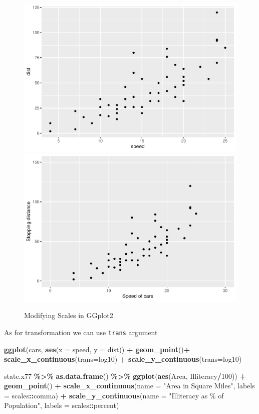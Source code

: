 \documentclass[
]{book}
\newenvironment{Shaded}{\begin{snugshade}}{\end{snugshade}}
\newcommand{\AttributeTok}[1]{\textcolor[rgb]{0.13,0.29,0.53}{#1}}
\newcommand{\DecValTok}[1]{\textcolor[rgb]{0.00,0.00,0.81}{#1}}
\newcommand{\FunctionTok}[1]{\textcolor[rgb]{0.13,0.29,0.53}{\textbf{#1}}}
\newcommand{\NormalTok}[1]{#1}
\newcommand{\SpecialCharTok}[1]{\textcolor[rgb]{0.81,0.36,0.00}{\textbf{#1}}}
\newcommand{\StringTok}[1]{\textcolor[rgb]{0.31,0.60,0.02}{#1}}
\begin{document}
\begin{figure}

{\centering \includegraphics[width=0.49\linewidth]{DauR_files/figure-latex/scale1-1} \includegraphics[width=0.49\linewidth]{DauR_files/figure-latex/scale1-2} 

}

\caption{Modifying Scales in GGplot2}\label{fig:scale1}
\end{figure}

As for transformation we can use \texttt{trans} argument

\begin{Shaded}
\begin{Highlighting}[]
\FunctionTok{ggplot}\NormalTok{(cars, }\FunctionTok{aes}\NormalTok{(}\AttributeTok{x =}\NormalTok{ speed, }\AttributeTok{y =}\NormalTok{ dist)) }\SpecialCharTok{+} 
  \FunctionTok{geom\_point}\NormalTok{()}\SpecialCharTok{+}
  \FunctionTok{scale\_x\_continuous}\NormalTok{(}\AttributeTok{trans=}\StringTok{\textquotesingle{}log10\textquotesingle{}}\NormalTok{) }\SpecialCharTok{+}
  \FunctionTok{scale\_y\_continuous}\NormalTok{(}\AttributeTok{trans=}\StringTok{\textquotesingle{}log10\textquotesingle{}}\NormalTok{)}

\NormalTok{state.x77 }\SpecialCharTok{\%\textgreater{}\%} 
  \FunctionTok{as.data.frame}\NormalTok{() }\SpecialCharTok{\%\textgreater{}\%} 
  \FunctionTok{ggplot}\NormalTok{(}\FunctionTok{aes}\NormalTok{(Area, Illiteracy}\SpecialCharTok{/}\DecValTok{100}\NormalTok{)) }\SpecialCharTok{+}
  \FunctionTok{geom\_point}\NormalTok{() }\SpecialCharTok{+}
  \FunctionTok{scale\_x\_continuous}\NormalTok{(}\AttributeTok{name =} \StringTok{"Area in Square Miles"}\NormalTok{, }\AttributeTok{labels =}\NormalTok{ scales}\SpecialCharTok{::}\NormalTok{comma) }\SpecialCharTok{+}
  \FunctionTok{scale\_y\_continuous}\NormalTok{(}\AttributeTok{name =} \StringTok{"Illiteracy as \% of Population"}\NormalTok{, }\AttributeTok{labels =}\NormalTok{ scales}\SpecialCharTok{::}\NormalTok{percent)}
\end{Highlighting}
\end{Shaded}
\end{document}
